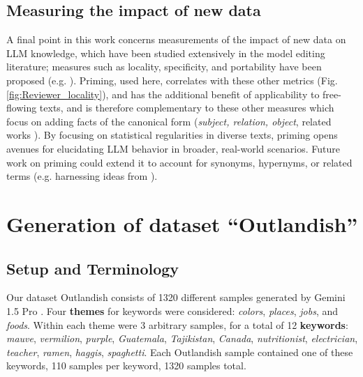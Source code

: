 \documentclass[11pt, a4paper, logo, copyright]{googledeepmind}
\theoremstyle{plain}
\theoremstyle{definition}
\theoremstyle{remark}
\begin{document}
\subsection{Measuring the impact of new data }
A final point in this work concerns measurements of the impact of new data on LLM knowledge, which have been studied extensively in the model editing literature; measures such as locality, specificity, and portability have been proposed (e.g. \cite{bau1, portability}). Priming, used here, correlates with these other metrics (Fig. \ref{fig:Reviewer_locality}), and has the additional benefit of applicability to free-flowing texts, and is therefore complementary to these other measures which focus on adding facts of the canonical form (\textit{subject, relation, object}, related works \citep{bau1, locality, Uli_dataset, geva_KE_dataset, levy_dataset}). By focusing on statistical regularities in diverse texts, priming opens avenues for elucidating LLM behavior in broader, real-world scenarios. Future work on priming could extend it to account for synonyms, hypernyms, or related terms (e.g. harnessing ideas from \cite{nature_hallucinations}). 





\section{Generation of dataset ``Outlandish''}

\subsection{Setup and Terminology}
\label{sec:terminology}

Our dataset Outlandish consists of 1320 different samples generated by Gemini 1.5 Pro \citep{team2023gemini}. Four \textbf{themes} for keywords were considered: \textit{colors}, \textit{places}, \textit{jobs}, and \textit{foods}. Within each theme were 3 arbitrary samples, for a total of 12 \textbf{keywords}: \textit{mauve}, \textit{vermilion}, \textit{purple}, \textit{Guatemala}, \textit{Tajikistan}, \textit{Canada}, \textit{nutritionist}, \textit{electrician}, \textit{teacher}, \textit{ramen}, \textit{haggis}, \textit{spaghetti}. Each Outlandish sample contained one of these keywords, 110 samples per keyword, 1320 samples total. 
\end{document}
